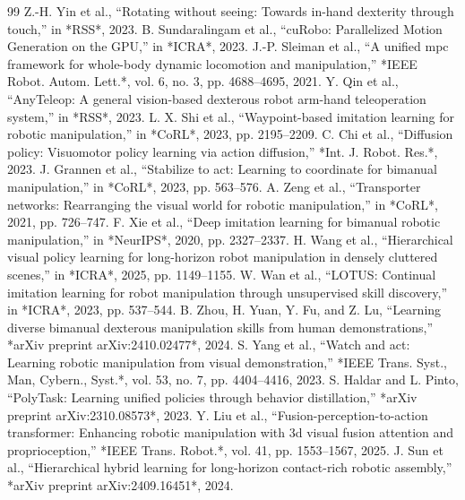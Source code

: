 \documentclass[letterpaper,journal]{IEEEtran}
\begin{document}
\begin{thebibliography}{99}
 Z.-H. Yin et al., ``Rotating without seeing: Towards in-hand dexterity through touch,'' in *RSS*, 2023.
 B. Sundaralingam et al., ``cuRobo: Parallelized Motion Generation on the GPU,'' in *ICRA*, 2023.
 J.-P. Sleiman et al., ``A unified mpc framework for whole-body dynamic locomotion and manipulation,'' *IEEE Robot. Autom. Lett.*, vol. 6, no. 3, pp. 4688--4695, 2021.
 Y. Qin et al., ``AnyTeleop: A general vision-based dexterous robot arm-hand teleoperation system,'' in *RSS*, 2023.
 L. X. Shi et al., ``Waypoint-based imitation learning for robotic manipulation,'' in *CoRL*, 2023, pp. 2195--2209.
 C. Chi et al., ``Diffusion policy: Visuomotor policy learning via action diffusion,'' *Int. J. Robot. Res.*, 2023.
 J. Grannen et al., ``Stabilize to act: Learning to coordinate for bimanual manipulation,'' in *CoRL*, 2023, pp. 563--576.
 A. Zeng et al., ``Transporter networks: Rearranging the visual world for robotic manipulation,'' in *CoRL*, 2021, pp. 726--747.
 F. Xie et al., ``Deep imitation learning for bimanual robotic manipulation,'' in *NeurIPS*, 2020, pp. 2327--2337.
 H. Wang et al., ``Hierarchical visual policy learning for long-horizon robot manipulation in densely cluttered scenes,'' in *ICRA*, 2025, pp. 1149--1155.
 W. Wan et al., ``LOTUS: Continual imitation learning for robot manipulation through unsupervised skill discovery,'' in *ICRA*, 2023, pp. 537--544.
 B. Zhou, H. Yuan, Y. Fu, and Z. Lu, ``Learning diverse bimanual dexterous manipulation skills from human demonstrations,'' *arXiv preprint arXiv:2410.02477*, 2024.
 S. Yang et al., ``Watch and act: Learning robotic manipulation from visual demonstration,'' *IEEE Trans. Syst., Man, Cybern., Syst.*, vol. 53, no. 7, pp. 4404--4416, 2023.
 S. Haldar and L. Pinto, ``PolyTask: Learning unified policies through behavior distillation,'' *arXiv preprint arXiv:2310.08573*, 2023.
 Y. Liu et al., ``Fusion-perception-to-action transformer: Enhancing robotic manipulation with 3d visual fusion attention and proprioception,'' *IEEE Trans. Robot.*, vol. 41, pp. 1553--1567, 2025.
 J. Sun et al., ``Hierarchical hybrid learning for long-horizon contact-rich robotic assembly,'' *arXiv preprint arXiv:2409.16451*, 2024.
\end{thebibliography}
\end{document}
